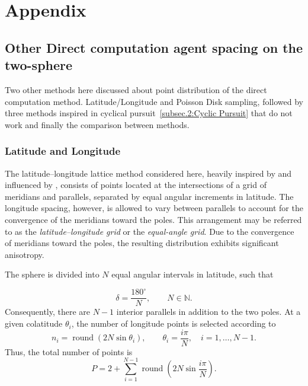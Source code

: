 
%

\chapter{Appendix}
\label{cha:Appendix}


\section{Other Direct computation agent spacing on the two-sphere} \label{annex:Other Direct computation agent spacing on the two-sphere}

Two other methods here discussed about point distribution of the direct computation method. Latitude/Longitude and Poisson Disk sampling, followed by three methods inspired in cyclical pursuit~\ref{subsec.2:Cyclic Pursuit} that do not work and finally the comparison between methods.

\subsection{Latitude and Longitude} \label{sec.2:Latitude and longitude}

The latitude--longitude lattice method considered here, heavily inspired by and influenced by \cite{Latitude_Longitude_vs_fibonacci}, consists of points located at the intersections of a grid of meridians and parallels, separated by equal angular increments in latitude. The longitude spacing, however, is allowed to vary between parallels to account for the convergence of the meridians toward the poles. This arrangement may be referred to as the \emph{latitude--longitude grid} or the \emph{equal-angle grid}. Due to the convergence of meridians toward the poles, the resulting distribution exhibits significant anisotropy.

The sphere is divided into \(N\) equal angular intervals in latitude, such that

$$
\delta = \frac{180^\circ}{N},
\qquad N \in \mathbb{N}.
$$
Consequently, there are \(N-1\) interior parallels in addition to the two poles. At a given colatitude \(\theta_i\), the number of longitude points is selected according to
$$
n_i = \operatorname{round}\left(2N\sin\theta_i\right),
\qquad
\theta_i = \frac{i\pi}{N},
\quad i=1,\ldots,N-1.
$$
Thus, the total number of points is
$$
P =
2+
\sum_{i=1}^{N-1}
\operatorname{round}
\left(
2N\sin\frac{i\pi}{N}
\right).
$$

